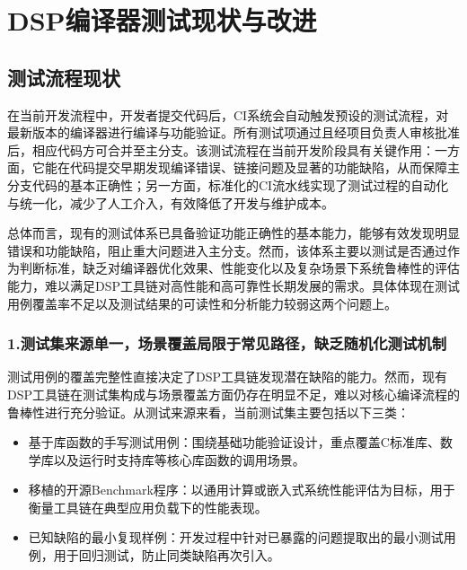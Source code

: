 \section{DSP编译器测试现状与改进}


\subsection{测试流程现状}
在当前开发流程中，开发者提交代码后，CI系统会自动触发预设的测试流程，对最新版本的编译器进行编译与功能验证。所有测试项通过且经项目负责人审核批准后，相应代码方可合并至主分支。该测试流程在当前开发阶段具有关键作用：一方面，它能在代码提交早期发现编译错误、链接问题及显著的功能缺陷，从而保障主分支代码的基本正确性；另一方面，标准化的CI流水线实现了测试过程的自动化与统一化，减少了人工介入，有效降低了开发与维护成本。

\par

总体而言，现有的测试体系已具备验证功能正确性的基本能力，能够有效发现明显错误和功能缺陷，阻止重大问题进入主分支。然而，该体系主要以测试是否通过作为判断标准，缺乏对编译器优化效果、性能变化以及复杂场景下系统鲁棒性的评估能力，难以满足DSP工具链对高性能和高可靠性长期发展的需求。具体体现在测试用例覆盖率不足以及测试结果的可读性和分析能力较弱这两个问题上。


\subsubsection{1.测试集来源单一，场景覆盖局限于常见路径，缺乏随机化测试机制}
测试用例的覆盖完整性直接决定了DSP工具链发现潜在缺陷的能力。然而，现有DSP工具链在测试集构成与场景覆盖方面仍存在明显不足，难以对核心编译流程的鲁棒性进行充分验证。从测试来源来看，当前测试集主要包括以下三类：

\begin{itemize}
	\item
	基于库函数的手写测试用例：围绕基础功能验证设计，重点覆盖C标准库、数学库以及运行时支持库等核心库函数的调用场景。
	
	\item
	移植的开源Benchmark程序：以通用计算或嵌入式系统性能评估为目标，用于衡量工具链在典型应用负载下的性能表现。
	
	\item 
	已知缺陷的最小复现样例：开发过程中针对已暴露的问题提取出的最小测试用例，用于回归测试，防止同类缺陷再次引入。
	
\end{itemize}

